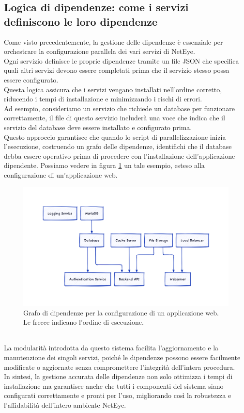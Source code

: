 \subsection{Logica di dipendenze: come i servizi definiscono le loro dipendenze}
\label{sub:dipendenze}

Come visto precedentemente, la gestione delle dipendenze è essenziale per orchestrare
la configurazione parallela dei vari servizi di NetEye.\\ Ogni servizio definisce
le proprie dipendenze tramite un file JSON che specifica quali altri servizi devono
essere completati prima che il servizio stesso possa essere configurato.\\ Questa
logica assicura che i servizi vengano installati nell'ordine corretto, riducendo
i tempi di installazione e minimizzando i rischi di errori.\\ Ad esempio, consideriamo
un servizio che richiede un database per funzionare correttamente, il file 
di questo servizio includerà una voce che indica che il servizio del database deve
essere installato e configurato prima.\\ Questo approccio garantisce che quando lo
script di parallelizzazione inizia l'esecuzione, costruendo un grafo delle
dipendenze, identifichi che il database debba essere operativo prima di procedere
con l'installazione dell'applicazione dipendente. Possiamo vedere in figura
\ref{fig:dipendenze_database} un tale esempio, esteso alla configurazione di un'applicazione
web.
\begin{figure}[ht]
  \centering
  \includegraphics[width=1\textwidth]{images/dipendenze_database.png}
  \caption{Grafo di dipendenze per la configurazione di un applicazione web.\\
  Le frecce indicano l'ordine di esecuzione.}
  \label{fig:dipendenze_database}
\end{figure}\\ La modularità introdotta da questo sistema facilita l'aggiornamento
e la manutenzione dei singoli servizi, poiché le dipendenze possono essere
facilmente modificate o aggiornate senza compromettere l'integrità dell'intera
procedura.\\ In sintesi, la gestione accurata delle dipendenze non solo ottimizza
i tempi di installazione ma garantisce anche che tutti i componenti del sistema siano
configurati correttamente e pronti per l'uso, migliorando così la robustezza e l'affidabilità
dell'intero ambiente NetEye.

